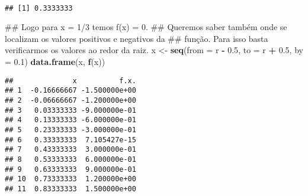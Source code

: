 \documentclass[]{book}
\newenvironment{Shaded}{\begin{snugshade}}{\end{snugshade}}
\newcommand{\KeywordTok}[1]{\textcolor[rgb]{0.13,0.29,0.53}{\textbf{#1}}}
\newcommand{\DataTypeTok}[1]{\textcolor[rgb]{0.13,0.29,0.53}{#1}}
\newcommand{\DecValTok}[1]{\textcolor[rgb]{0.00,0.00,0.81}{#1}}
\newcommand{\FloatTok}[1]{\textcolor[rgb]{0.00,0.00,0.81}{#1}}
\newcommand{\StringTok}[1]{\textcolor[rgb]{0.31,0.60,0.02}{#1}}
\newcommand{\CommentTok}[1]{\textcolor[rgb]{0.56,0.35,0.01}{\textit{#1}}}
\newcommand{\ControlFlowTok}[1]{\textcolor[rgb]{0.13,0.29,0.53}{\textbf{#1}}}
\newcommand{\OperatorTok}[1]{\textcolor[rgb]{0.81,0.36,0.00}{\textbf{#1}}}
\newcommand{\NormalTok}[1]{#1}
\begin{document}
\begin{enumerate}
  ~

\begin{Shaded}
\end{Shaded}

\begin{verbatim}
## [1] 0.3333333
\end{verbatim}

\begin{Shaded}
\begin{Highlighting}[]
\NormalTok{##  Logo para x = 1/3 temos f(x) = 0.}
\NormalTok{##  Queremos saber também onde se localizam os valores positivos e negativos da}
\NormalTok{## função. Para isso basta verificarmos os valores ao redor da raiz.}
\NormalTok{x <-}\StringTok{ }\KeywordTok{seq}\NormalTok{(}\DataTypeTok{from =}\NormalTok{ r }\OperatorTok{-}\StringTok{ }\FloatTok{0.5}\NormalTok{, }\DataTypeTok{to =}\NormalTok{ r }\OperatorTok{+}\StringTok{ }\FloatTok{0.5}\NormalTok{, }\DataTypeTok{by =} \FloatTok{0.1}\NormalTok{)}
\KeywordTok{data.frame}\NormalTok{(x, }\KeywordTok{f}\NormalTok{(x))}
\end{Highlighting}
\end{Shaded}

\begin{verbatim}
##              x          f.x.
## 1  -0.16666667 -1.500000e+00
## 2  -0.06666667 -1.200000e+00
## 3   0.03333333 -9.000000e-01
## 4   0.13333333 -6.000000e-01
## 5   0.23333333 -3.000000e-01
## 6   0.33333333  7.105427e-15
## 7   0.43333333  3.000000e-01
## 8   0.53333333  6.000000e-01
## 9   0.63333333  9.000000e-01
## 10  0.73333333  1.200000e+00
## 11  0.83333333  1.500000e+00
\end{verbatim}


\end{enumerate}
\end{document}
